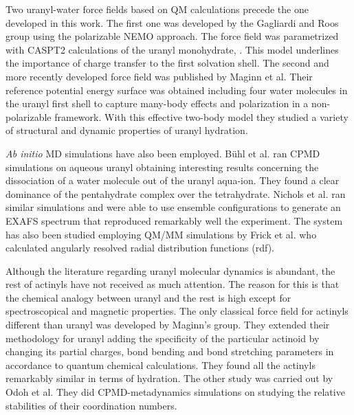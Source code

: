 Two uranyl-water force fields based on QM calculations precede the one developed in this work. The 
first one was developed by the Gagliardi and Roos group\cite{JACS_Roos_2005} using the polarizable 
NEMO approach\cite{NEMOJPC90}. The force field was parametrized with CASPT2 calculations of the 
uranyl monohydrate, 
\newline{}. This model underlines the importance of charge transfer to the 
first 
solvation shell. The second and more 
recently developed force field was published by Maginn et 
al.\cite{JPhysChemB_Tiwari_2012} 
Their reference potential energy surface was obtained including four water molecules in the uranyl 
first shell to capture many-body effects and polarization in a non-polarizable framework. With this 
effective two-body 
model they studied a variety of 
structural and dynamic properties of 
uranyl hydration.\cite{JPhysChemB_Tiwari_2012,PhysChemChemPhys_Tiwari_2014}

\textit{Ab initio} MD simulations have also been employed. Bühl et al. ran 
CPMD simulations on aqueous uranyl obtaining interesting results concerning the 
dissociation of a water molecule out of the uranyl aqua-ion.\cite{JACS_Buhl_2005} They 
found a clear dominance of the pentahydrate complex over the tetrahydrate. Nichols et al. 
ran similar simulations and were able to use ensemble configurations to generate an EXAFS 
spectrum that reproduced remarkably well the 
experiment.\cite{JChemPhys_Nichols_2008} The system has also 
been studied employing QM/MM simulations by Frick et al. who calculated
angularly resolved radial distribution functions (\gls{rdf}).\cite{JPhysChemA_Frick_2009} 

Although the literature regarding uranyl molecular dynamics is abundant, the rest of actinyls have 
not received as much attention. The reason for this is that the 
chemical analogy between uranyl and the rest is high except for spectroscopical and magnetic
properties. The only classical force 
field for actinyls different than uranyl was developed by Maginn's 
group\cite{PhysChemChemPhys_Pomogaev_2013,PhysChemChemPhys_Tiwari_2014}. They extended their 
methodology for uranyl adding the specificity of the particular actinoid by changing its 
partial charges, bond bending and bond stretching  parameters in accordance to quantum 
chemical 
calculations. They found all the actinyls remarkably similar in terms of hydration. The 
other study was carried out by Odoh et al.\cite{JPhysChemA_Odoh_2013} They did 
CPMD-metadynamics simulations on  studying the relative stabilities of their 
coordination numbers.

